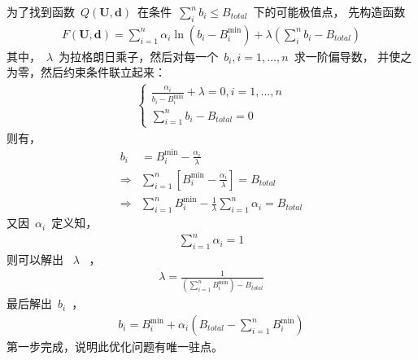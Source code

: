 为了找到函数~$Q(\mathbf{U}, \mathbf{d})$~在条件~$\sum_i^n b_i \le B_{total}$~下的可能极值点，
先构造函数
\begin{align}
    F(\mathbf{U}, \mathbf{d}) =  \sum_{i=1}^n  \alpha_i \ln \left(b_i - B_i^{\min} \right)
    + \lambda(\sum_i^n b_i - B_{total} ) 
    \label{eqn:chap_nash:lang_functions}
\end{align}
其中，~$\lambda$~为拉格朗日乘子，然后对每一个~$b_i, i=1,\dots,n$~求一阶偏导数，
并使之为零，然后约束条件联立起来：
\begin{align}   
    \begin{cases}
        \displaystyle\frac{\alpha_i}{b_i - B_i^{\min}} + \lambda = 0, i=1,\dots, n  \\
        \displaystyle \sum_{i=1}^n b_i - B_{total} = 0
    \end{cases}
\end{align}
则有，
\begin{align*}
    b_i &= B_i^{\min} - \frac{\alpha_i}{\lambda} \\
    \Rightarrow & \sum_{i=1}^n \left[ B_i^{\min} - \frac{\alpha_i}{\lambda} \right] = B_{total} \\
    \Rightarrow & \sum_{i=1}^n B_i^{\min} - \frac{1}{\lambda} \sum_{i=1}^n \alpha_i = B_{total}
\end{align*}
又因~$\alpha_i$~定义知，
\begin{align*}
    \sum_{i=1}^n \alpha_i = 1
\end{align*}
则可以解出 ~$\lambda$~ ，
\begin{align*}
    \lambda = \frac{1}{(\sum_{i=1}^n B_i^{\min} )  -B_{total} }
\end{align*}
最后解出~$b_i$~，
\begin{align}
    b_i = B_i^{\min} + \alpha_i \left( B_{total} - \sum_{i=1}^n B_i^{\min}  \right)
    \label{eqn:chap_nash:res_allocation}
\end{align}
第一步完成，说明此优化问题有唯一驻点。

